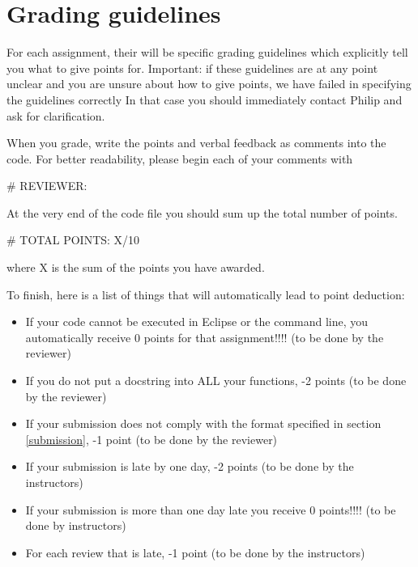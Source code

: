 \documentclass[a4paper, leqno, 11pt]{article}
\begin{document}
\section{Grading guidelines}
For each assignment, their will be specific grading guidelines which explicitly tell you what to give points for. Important: if these
guidelines are at any point unclear and you are unsure about how to give points, we have failed in specifying the guidelines correctly
In that case you should immediately contact Philip and ask for clarification.

When you grade, write the points and verbal feedback as comments into the code. For better readability, please begin each of your comments
with
\begin{center}
\# REVIEWER: 
\end{center}
At the very end of the code file you should sum up the total number of points. 
\begin{center}
\# TOTAL POINTS: X/10 
\end{center}
where X is the sum of the points you have awarded.

To finish, here is a list of things that will automatically lead to point deduction:
\begin{itemize}
\item If your code cannot be executed in Eclipse or the command line, you automatically receive 0 points for that assignment!!!! (to be done by the reviewer) 
\item If you do not put a docstring into ALL your functions, -2 points (to be done by the reviewer)
\item If your submission does not comply with the format specified in section \ref{submission}, -1 point (to be done by the reviewer)
\item If your submission is late by one day, -2 points (to be done by the instructors)
\item If your submission is more than one day late you receive 0 points!!!! (to be done by instructors)
\item For each review that is late, -1 point (to be done by the instructors)
\end{itemize}
\end{document}
